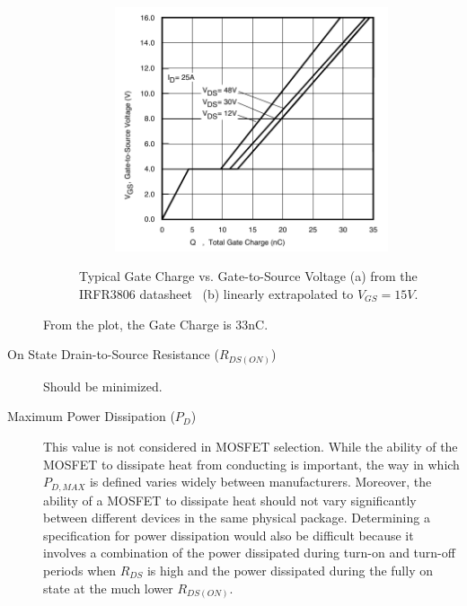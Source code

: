 \documentclass{article}
\begin{document}
\begin{description}
\begin{figure}[h]
\begin{subfigure}{0.4\textwidth}
		\caption{}
	\end{subfigure}
	\begin{subfigure}{0.4\textwidth}
		\includegraphics[width=\textwidth]{qg2}
		\caption{}
	\end{subfigure}
	\caption{Typical Gate Charge vs. Gate-to-Source Voltage (a) from the IRFR3806 datasheet \protect\footnotemark~(b) linearly extrapolated to $V_{GS}=15V$.}
	\label{fig:qg} 
\end{figure}
From the plot, the Gate Charge is 33nC.
\item[On State Drain-to-Source Resistance ($R_{DS(ON)}$)] Should be minimized.
 \item[Maximum Power Dissipation ($P_D$)] This value is not considered in MOSFET selection. While the ability of the MOSFET to dissipate heat from conducting is important, the way in which $P_{D,MAX}$ is defined varies widely between manufacturers. Moreover, the ability of a MOSFET to dissipate heat should not vary significantly between different devices in the same physical package. Determining a specification for power dissipation would also be difficult because it involves a combination of the power dissipated during turn-on and turn-off periods when $R_{DS}$ is high and the power dissipated during the fully on state at the much lower $R_{DS(ON)}$.
\end{description}
\end{document}
